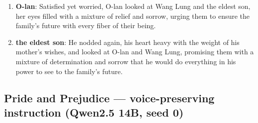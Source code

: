 \documentclass[10pt]{article}
\begin{document}
\begin{enumerate}
\item \textbf{O-lan}: Satisfied yet worried, O-lan looked at Wang Lung and the eldest son, her eyes filled with a mixture of relief and sorrow, urging them to ensure the family's future with every fiber of their being.

\item \textbf{the eldest son}: He nodded again, his heart heavy with the weight of his mother's wishes, and looked at O-lan and Wang Lung, promising them with a mixture of determination and sorrow that he would do everything in his power to see to the family's future.

\end{enumerate}

\subsection*{Pride and Prejudice --- voice-preserving instruction (Qwen2.5 14B, seed 0)}
\end{document}
